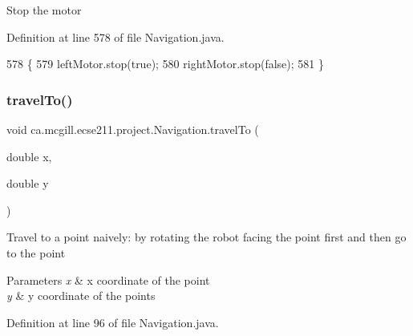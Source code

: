 Stop the motor 

Definition at line 578 of file Navigation.\+java.


\begin{DoxyCode}
578                      \{
579     leftMotor.stop(\textcolor{keyword}{true});
580     rightMotor.stop(\textcolor{keyword}{false});
581   \}
\end{DoxyCode}
\mbox{\label{classca_1_1mcgill_1_1ecse211_1_1project_1_1_navigation_ad89b3dd084d81b4ec4d89ea73ba13eaa}} 
\subsubsection{\texorpdfstring{travel\+To()}{travelTo()}}
{\footnotesize\ttfamily void ca.\+mcgill.\+ecse211.\+project.\+Navigation.\+travel\+To (\begin{DoxyParamCaption}\item[{double}]{x,  }\item[{double}]{y }\end{DoxyParamCaption})}

Travel to a point naively\+: by rotating the robot facing the point first and then go to the point 
\begin{DoxyParams}{Parameters}
{\em x} & x coordinate of the point \\
\hline
{\em y} & y coordinate of the points \\
\hline
\end{DoxyParams}


Definition at line 96 of file Navigation.\+java.


